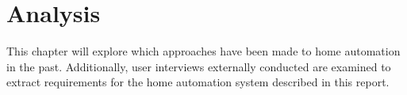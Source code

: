 \chapter{Analysis}\label{part:analysis}

This chapter will explore which approaches have been made to home automation in the past. Additionally, user interviews externally conducted are examined to extract requirements for the home automation system described in this report.




